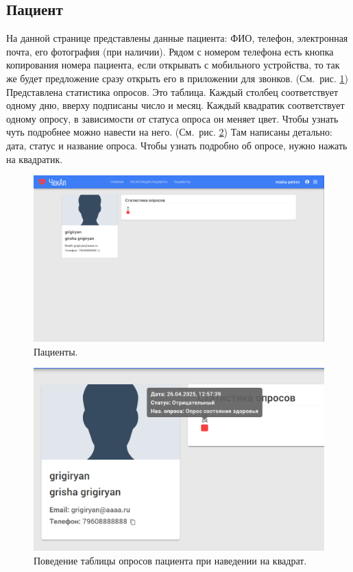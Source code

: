 \subsection{Пациент}\label{subsec:-222}
На данной странице представлены данные пациента: ФИО, телефон, электронная почта, его фотография (при наличии).
Рядом с номером телефона есть кнопка копирования номера пациента, если открывать с мобильного устройства, то так же будет предложение сразу открыть его в приложении для звонков.
(См.\ рис. \ref{fig:figure52})
Представлена статистика опросов.
Это таблица.
Каждый столбец соответствует одному дню, вверху подписаны число и месяц.
Каждый квадратик соответствует одному опросу, в зависимости от статуса опроса он меняет цвет.
Чтобы узнать чуть подробнее можно навести на него.
(См.\ рис. \ref{fig:figure521})
Там написаны детально: дата, статус и название опроса.
Чтобы узнать подробно об опросе, нужно нажать на квадратик.

\begin{figure}[ht]
    \includegraphics[width=\textwidth]{images/screenshots/patient}
    \caption{Пациенты.}
    \label{fig:figure52}
\end{figure}

\begin{figure}[ht]
    \includegraphics[width=\textwidth]{images/screenshots/patient_hover}
    \caption{Поведение таблицы опросов пациента при наведении на квадрат.}
    \label{fig:figure521}
\end{figure}


